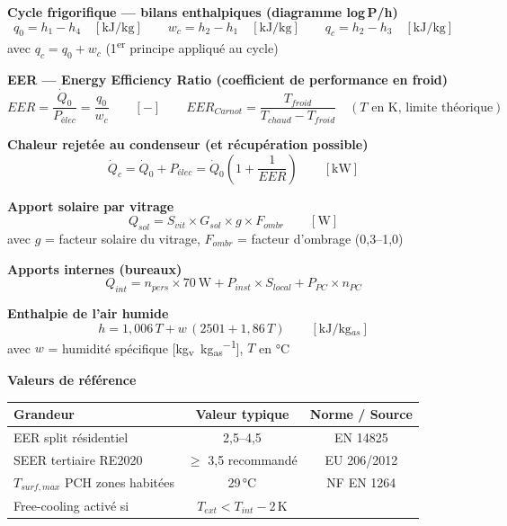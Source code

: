 \begin{tcolorbox}[
  enhanced, colback=FedBlue!3, colframe=FedBlue!50,
  fonttitle=\bfseries\sffamily, coltitle=FedBlue,
  title={FICHE MÉMO — Climatisation}, boxrule=0.8pt, arc=2pt,
  width=\textwidth
]

\textbf{Cycle frigorifique — bilans enthalpiques (diagramme log\,P/h)}
\[
  q_0 = h_1 - h_4 \quad [\si{\kilo\joule\per\kilogram}]
  \qquad
  w_c = h_2 - h_1 \quad [\si{\kilo\joule\per\kilogram}]
  \qquad
  q_c = h_2 - h_3 \quad [\si{\kilo\joule\per\kilogram}]
\]
avec $q_c = q_0 + w_c$ (1\textsuperscript{er} principe appliqué au cycle)

\textbf{EER — Energy Efficiency Ratio (coefficient de performance en froid)}
\[
  EER = \frac{\dot{Q}_0}{P_{élec}} = \frac{q_0}{w_c} \qquad [-]
  \qquad
  EER_{Carnot} = \frac{T_{froid}}{T_{chaud} - T_{froid}} \quad (T \text{ en K, limite théorique})
\]

\textbf{Chaleur rejetée au condenseur (et récupération possible)}
\[
  \dot{Q}_c = \dot{Q}_0 + P_{élec} = \dot{Q}_0 \left(1 + \frac{1}{EER}\right) \qquad [\si{\kilo\watt}]
\]

\textbf{Apport solaire par vitrage}
\[
  Q_{sol} = S_{vit} \times G_{sol} \times g \times F_{ombr} \qquad [\si{\watt}]
\]
avec $g$ = facteur solaire du vitrage, $F_{ombr}$ = facteur d'ombrage (0,3–1,0)

\textbf{Apports internes (bureaux)}
\[
  Q_{int} = n_{pers} \times \SI{70}{\watt} + P_{inst} \times S_{local} + P_{PC} \times n_{PC}
\]

\textbf{Enthalpie de l'air humide}
\[
  h = 1{,}006\,T + w\,(2501 + 1{,}86\,T) \qquad [\si{\kilo\joule\per\kilogram_{as}}]
\]
avec $w$ = humidité spécifique [\si{\kilogram_v\per\kilogram_{as}}], $T$ en °C

\textbf{Valeurs de référence}

\begin{center}\small
\begin{tabular}{lcc}
  \toprule
  Grandeur & Valeur typique & Norme / Source \\
  \midrule
  EER split résidentiel & 2,5–4,5 & EN 14825 \\
  SEER tertiaire RE2020 & $\geq$ 3,5 recommandé & EU 206/2012 \\
  $T_{surf,max}$ PCH zones habitées & 29\,°C & NF EN 1264 \\
  Free-cooling activé si & $T_{ext} < T_{int} - 2\,\text{K}$ & \\
  \bottomrule
\end{tabular}
\end{center}

\end{tcolorbox}

\finchapitre
